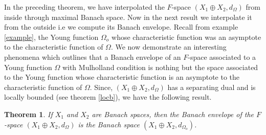 \documentclass[pdflatex,sn-mathphys-num]{sn-jnl}%
\theoremstyle{thmstyleone}%
\newtheorem{theorem}{Theorem}%
\theoremstyle{thmstyletwo}%
\theoremstyle{thmstylethree}%
\begin{document}
	In the preceding theorem, we have interpolated the $F$-space $(X_1\oplus X_2,d_\Omega)$ from inside through maximal Banach space. Now in the next result we interpolate it from the outside i.e we compute its Banach envelope. Recall from example \ref{example}, the Young function $\Omega_o$ whose characteristic function was an asymptote to the characteristic function of $\Omega$. We now demonstrate an interesting phenomena which outlines that a Banach envelope of an $F$-space associated to a Young function $\Omega$ with Mulholland condition is nothing but the space associated to the Young function whose characteristic function is an asymptote to the characteristic function of $\Omega$. Since, $(X_1\oplus X_2,d_\Omega)$ has a separating dual and is locally bounded (see theorem \ref{locb}), we have the following result.
	\begin{theorem}
		If $X_1$ and $X_2$ are Banach spaces, then the Banach envelope of the $F$-space $(X_1\oplus X_2,d_\Omega)$ is the Banach space $(X_1\oplus X_2,d_{\Omega_o})$.
	\end{theorem}
\end{document}
